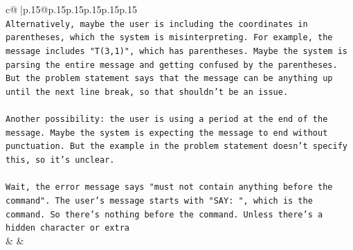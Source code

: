 \documentclass{article}
\begin{document}
{\begin{supertabular}{c@{$\;$}|p{.15\linewidth}@{}p{.15\linewidth}p{.15\linewidth}p{.15\linewidth}p{.15\linewidth}p{.15\linewidth}}
{{{\\ 
\texttt{Alternatively, maybe the user is including the coordinates in parentheses, which the system is misinterpreting. For example, the message includes "T(3,1)", which has parentheses. Maybe the system is parsing the entire message and getting confused by the parentheses. But the problem statement says that the message can be anything up until the next line break, so that shouldn't be an issue.} \\
\\ 
\texttt{Another possibility: the user is using a period at the end of the message. Maybe the system is expecting the message to end without punctuation. But the example in the problem statement doesn't specify this, so it's unclear.} \\
\\ 
\texttt{Wait, the error message says "must not contain anything before the command". The user's message starts with "SAY: ", which is the command. So there's nothing before the command. Unless there's a hidden character or extra} \\
            }
        }
    }
    & & \\ \\


\end{supertabular}}
\end{document}
